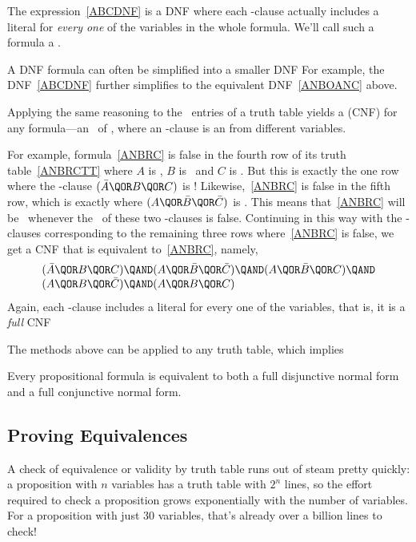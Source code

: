 The expression~\eqref{ABCDNF} is a DNF where each \QAND-clause
actually includes a literal for \emph{every one} of the variables in
the whole formula.  We'll call such a formula a . 

A DNF formula can often be simplified into a smaller DNF For example,
the DNF~\eqref{ABCDNF} further simplifies to the equivalent
DNF~\eqref{ANBOANC} above.

Applying the same reasoning to the \false\ entries of a truth table
yields a  (CNF)
 for any formula---an
\QAND\ of , where an \QOR-clause is an
 from different variables.

For example, formula~\eqref{ANBRC} is false in the fourth row of its
truth table~\eqref{ANBRCTT} where $A$ is \true, $B$ is \false\ and $C$
is \false.  But this is exactly the one row where the \QOR-clause
$(\bar{A} \QOR B \QOR C)$ is \false!  Likewise,~\eqref{ANBRC} is
false in the fifth row, which is exactly where $(A \QOR \bar{B} \QOR
\bar{C})$ is \false.  This means that~\eqref{ANBRC} will be
\false\ whenever the \QAND\ of these two \QOR-clauses is false.
\iffalse $(\bar{A} \QOR B \QOR C) \QAND (A \QOR \bar{B} \QOR \bar{C})$
is \false.  \fi Continuing in this way with the \QOR-clauses
corresponding to the remaining three rows where~\eqref{ANBRC} is
false, we get a CNF that is equivalent to~\eqref{ANBRC}, namely,
\[\begin{array}{l}
(\bar{A} \QOR B \QOR C)  \QAND (A \QOR \bar{B} \QOR \bar{C}) 
        \QAND (A \QOR \bar{B} \QOR C)  \QAND \\
(A \QOR B \QOR \bar{C}) \QAND (A \QOR B \QOR C)
\end{array}\]
Again, each \QOR-clause includes a literal for every one of the
variables, that is, it is a \emph{full} CNF

The methods above can be applied to any truth table, which implies
\begin{theorem}
Every propositional formula is equivalent to both a full disjunctive
normal form and a full conjunctive normal form.
\end{theorem}

\subsection{Proving Equivalences}\label{propositional_equivalences_sec}
A check of equivalence
or validity by truth table runs out of steam
pretty quickly: a proposition with $n$ variables has a truth table
with $2^n$ lines, so the effort required to check a proposition
grows exponentially with the number of variables.  For a
proposition with just 30 variables, that's already over a billion
lines to check!

